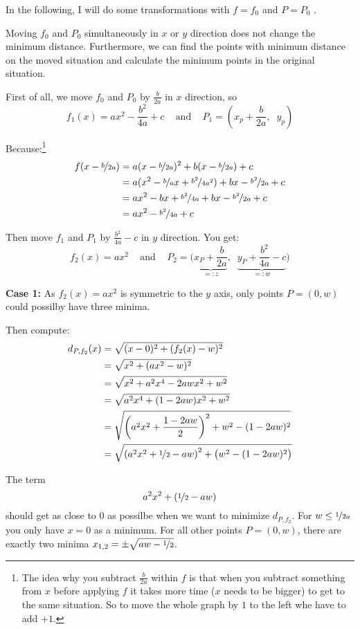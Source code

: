 \documentclass[a4paper]{scrartcl}
\theoremstyle{break}
\theoremstyle{nonumberplain}
\begin{document}
In the following, I will do some transformations with $f = f_0$ and
$P = P_0$ .

Moving $f_0$ and $P_0$ simultaneously in $x$ or $y$ direction does 
not change the minimum distance. Furthermore, we can find the 
points with minimum distance on the moved situation and calculate
the minimum points in the original situation.

First of all, we move $f_0$ and $P_0$ by $\frac{b}{2a}$ in $x$ direction, so
\[f_1(x) = ax^2 - \frac{b^2}{4a} + c \;\;\;\text{ and }\;\;\; P_1 = \left (x_p+\frac{b}{2a},\;\; y_p \right )\]

Because:\footnote{The idea why you subtract $\frac{b}{2a}$ within
$f$ is that when you subtract something from $x$ before applying
$f$ it takes more time ($x$ needs to be bigger) to get to the same
situation. So to move the whole graph by $1$ to the left whe have
to add $+1$.}
\begin{align}
    f(x-\nicefrac{b}{2a}) &= a (x-\nicefrac{b}{2a})^2 + b (x-\nicefrac{b}{2a}) + c\\
    &= a (x^2 - \nicefrac{b}{a} x + \nicefrac{b^2}{4a^2}) + bx - \nicefrac{b^2}{2a} + c\\
    &= ax^2 - bx + \nicefrac{b^2}{4a} + bx - \nicefrac{b^2}{2a} + c\\
    &= ax^2 -\nicefrac{b^2}{4a} + c
\end{align}


Then move $f_1$ and $P_1$ by $\frac{b^2}{4a}-c$ in $y$ direction. You get:
\[f_2(x) = ax^2\;\;\;\text{ and }\;\;\; P_2 = \Big (\underbrace{x_P+\frac{b}{2a}}_{=: z},\;\; \underbrace{y_P+\frac{b^2}{4a}-c}_{=: w} \Big )\]

\textbf{Case 1:} As $f_2(x) = ax^2$ is symmetric to the $y$ axis, only points 
$P = (0, w)$ could possilby have three minima.

Then compute:
\begin{align}
  d_{P,{f_2}}(x)  &= \sqrt{(x-0)^2 + (f_2(x)-w)^2}\\
    &= \sqrt{x^2 + (ax^2-w)^2}\\
    &= \sqrt{x^2 + a^2 x^4-2aw x^2+w^2}\\
    &= \sqrt{a^2 x^4 + (1-2aw) x^2 + w^2}\\
    &= \sqrt{\left (a^2 x^2 + \frac{1-2 a w}{2} \right )^2 + w^2 - (1-2 a w)^2}\\
    &= \sqrt{\left (a^2 x^2 + \nicefrac{1}{2}-a w \right )^2 + \big (w^2 - (1-2 a w)^2 \big)}
\end{align}

The term 
\[a^2 x^2 + (\nicefrac{1}{2}-a w)\]
should get as close to $0$ as possilbe when we want to minimize 
$d_{P,{f_2}}$. For $w \leq \nicefrac{1}{2a}$ you only have $x = 0$ as a minimum.
For all other points $P = (0, w)$, there are exactly two minima $x_{1,2} = \pm \sqrt{aw - \nicefrac{1}{2}}$.
\end{document}
